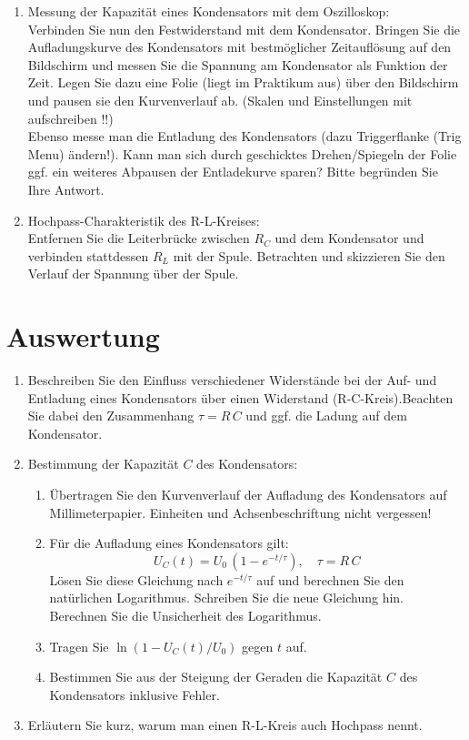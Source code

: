 \begin{enumerate}
 \item Messung der Kapazität eines Kondensators mit dem Oszilloskop:\\
	Verbinden Sie nun den Festwiderstand mit dem Kondensator. Bringen Sie die Aufladungskurve des Kondensators mit bestmöglicher Zeitauflösung auf den Bildschirm und messen Sie die Spannung am 	Kondensator als Funktion der Zeit. Legen Sie dazu eine Folie (liegt im Praktikum aus) über den Bildschirm und pausen sie den Kurvenverlauf ab. (Skalen und Einstellungen mit aufschreiben !!)\\
	Ebenso messe man die Entladung des Kondensators (dazu Triggerflanke (Trig Menu) ändern!). Kann man sich durch geschicktes Drehen/Spiegeln der Folie ggf. ein weiteres 
	Abpausen der Entladekurve sparen? Bitte begründen Sie Ihre Antwort.
 \item Hochpass-Charakteristik des R-L-Kreises:\\
  Entfernen Sie die Leiterbrücke zwischen $R_C$ und dem Kondensator und verbinden stattdessen $R_L$ mit der Spule. Betrachten und skizzieren Sie den Verlauf der Spannung über der Spule. 
\end{enumerate}

\section{Auswertung} 

\begin{enumerate}
 \item Beschreiben Sie den Einfluss verschiedener Widerstände bei der Auf- und Entladung eines Kondensators über einen Widerstand (R-C-Kreis).Beachten Sie dabei den Zusammenhang $\tau = R\,C$ und ggf. die Ladung auf dem Kondensator.
 \item Bestimmung der Kapazität $C$ des Kondensators:
  \begin{enumerate}
   \item Übertragen Sie den Kurvenverlauf der Aufladung des Kondensators auf Millimeterpapier. Einheiten und Achsenbeschriftung nicht vergessen!
   \item Für die Aufladung eines Kondensators gilt:
    \begin{equation}
     U_C(t) = U_0\, \left(1-e^{-t/\tau}\right), \quad \tau = R\, C
    \end{equation}
		Lösen Sie diese Gleichung nach $e^{-t/\tau}$ auf und berechnen Sie den natürlichen Logarithmus. Schreiben Sie die neue Gleichung hin. Berechnen Sie die Unsicherheit des Logarithmus.
   \item Tragen Sie $\ln\left(1-U_C(t)/U_0\right)$ gegen $t$ auf. 
   \item Bestimmen Sie aus der Steigung der Geraden die Kapazität $C$ des Kondensators inklusive Fehler.
  \end{enumerate}
 \item Erläutern Sie kurz, warum man einen R-L-Kreis auch Hochpass nennt.
\end{enumerate}